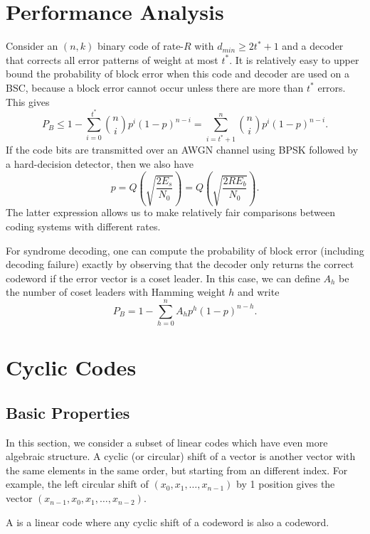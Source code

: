 \section{Performance Analysis}

Consider an $(n,k)$ binary code of rate-$R$ with $d_{min} \geq 2t^* + 1$ and a decoder that corrects all error patterns of weight at most $t^*$.
It is relatively easy to upper bound the probability of block error when this code and decoder are used on a BSC, because a block error cannot occur unless there are more than $t^*$ errors.
This gives
\[ P_{B}\leq1-\sum_{i=0}^{t^*}{n \choose i}p^{i}(1-p)^{n-i}=\sum_{i=t^*+1}^{n}{n \choose i}p^{i}(1-p)^{n-i}. \]
If the code bits are transmitted over an AWGN channel using BPSK followed by a hard-decision detector, then we also have
\[ p= Q\left( \sqrt{\frac{2 E_s}{N_0}} \right) = Q\left( \sqrt{\frac{2 R  E_b}{N_0}} \right). \]
The latter expression allows us to make relatively fair comparisons between coding systems with different rates.
 
For syndrome decoding, one can compute the probability of block error (including decoding failure) exactly by observing that the decoder only returns the correct codeword if the error vector is a coset leader.
In this case, we can define $A_h$ be the number of coset leaders with Hamming weight $h$ and write
\[ P_{B} = 1-\sum_{h=0}^{n} A_h p^h (1-p)^{n-h}. \]

\section{Cyclic Codes}

\subsection{Basic Properties}
In this section, we consider a subset of linear codes which have even more algebraic structure.
A cyclic (or circular) shift of a vector is another vector with the same elements in the same order, but starting from an different index.
For example, the left circular shift of $(x_0,x_1,\ldots,x_{n-1})$ by 1 position gives the vector $(x_{n-1},x_0,x_1,\ldots,x_{n-2})$.

\begin{definition}
A  is a linear code where any cyclic shift of a codeword is also a codeword.
\end{definition}

